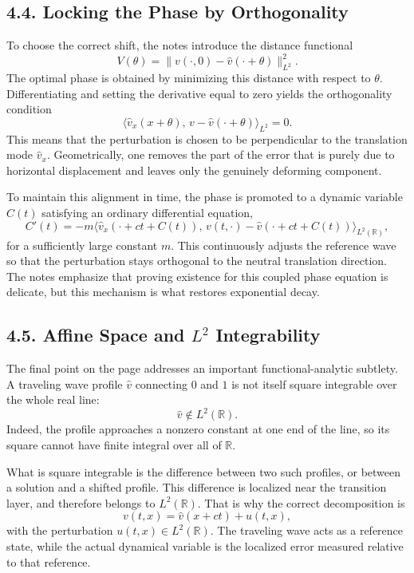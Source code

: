 \documentclass[11pt]{article}
\theoremstyle{definition}
\theoremstyle{remark}
\begin{document}
\subsection*{4.4. Locking the Phase by Orthogonality}
To choose the correct shift, the notes introduce the distance functional
\[
V(\theta)=\|v(\cdot,0)-\widehat v(\cdot+\theta)\|_{L^2}^2.
\]
The optimal phase is obtained by minimizing this distance with respect to \(\theta\). Differentiating and setting the derivative equal to zero yields the orthogonality condition
\[
\langle \widehat v_x(x+\theta),\,v-\widehat v(\cdot+\theta)\rangle_{L^2}=0.
\]
This means that the perturbation is chosen to be perpendicular to the translation mode \(\widehat v_x\). Geometrically, one removes the part of the error that is purely due to horizontal displacement and leaves only the genuinely deforming component.

To maintain this alignment in time, the phase is promoted to a dynamic variable \(C(t)\) satisfying an ordinary differential equation,
\[
C'(t)=-m\langle \widehat v_x(\cdot+ct+C(t)),\,v(t,\cdot)-\widehat v(\cdot+ct+C(t))\rangle_{L^2(\mathbb R)},
\]
for a sufficiently large constant \(m\). This continuously adjusts the reference wave so that the perturbation stays orthogonal to the neutral translation direction. The notes emphasize that proving existence for this coupled phase equation is delicate, but this mechanism is what restores exponential decay.

\subsection*{4.5. Affine Space and \(L^2\) Integrability}
The final point on the page addresses an important functional-analytic subtlety. A traveling wave profile \(\widehat v\) connecting \(0\) and \(1\) is not itself square integrable over the whole real line:
\[
\widehat v\notin L^2(\mathbb R).
\]
Indeed, the profile approaches a nonzero constant at one end of the line, so its square cannot have finite integral over all of \(\mathbb R\).

What is square integrable is the difference between two such profiles, or between a solution and a shifted profile. This difference is localized near the transition layer, and therefore belongs to \(L^2(\mathbb R)\). That is why the correct decomposition is
\[
v(t,x)=\widehat v(x+ct)+u(t,x),
\]
with the perturbation \(u(t,x)\in L^2(\mathbb R)\). The traveling wave acts as a reference state, while the actual dynamical variable is the localized error measured relative to that reference.
\end{document}
